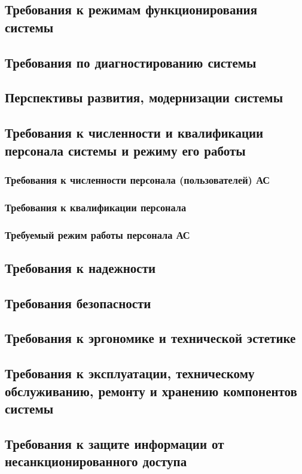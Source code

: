 \subsection{Требования к режимам функционирования системы}
\subsection{Требования по диагностированию системы}
\subsection{Перспективы развития, модернизации системы}
\subsection{Требования к численности и квалификации персонала системы и режиму его работы}
\subsubsection{Требования к численности персонала (пользователей) АС}
\subsubsection{Требования к квалификации персонала}
\subsubsection{Требуемый режим работы персонала АС}
\subsection{Требования к надежности}
\subsection{Требования безопасности}
\subsection{Требования к эргономике и технической эстетике}
\subsection{Требования к эксплуатации, техническому обслуживанию, ремонту и хранению компонентов 
    системы}
\subsection{Требования к защите информации от несанкционированного доступа}
